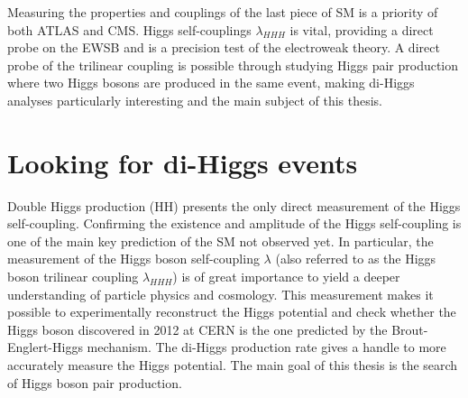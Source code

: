 Measuring the properties and couplings of the last piece of SM is a priority of both ATLAS and CMS. Higgs self-couplings $\lambda_{HHH}$ is vital, providing a direct probe on the EWSB and is a precision test of the electroweak theory. A direct probe of the trilinear coupling is possible through studying Higgs pair production where two Higgs bosons are produced in the same event, making di-Higgs analyses particularly interesting and the main subject of this thesis.

\section{Looking for di-Higgs events}
\label{chap1:HH}
Double Higgs production (HH) presents the only direct measurement of the Higgs self-coupling. Confirming the existence and amplitude of the Higgs self-coupling is one of the main key prediction of the SM not observed yet. In particular, the measurement of the Higgs boson self-coupling $\lambda$ (also referred to as the Higgs boson trilinear coupling $\lambda_{HHH}$) is of great importance to yield a deeper understanding of particle physics and cosmology. This measurement makes it possible to experimentally reconstruct the Higgs potential and check whether the Higgs boson discovered in 2012 at CERN is the one predicted by the Brout-Englert-Higgs mechanism. The di-Higgs production rate gives a handle to more accurately measure the Higgs potential. The main goal of this thesis is the search of Higgs boson pair production.

